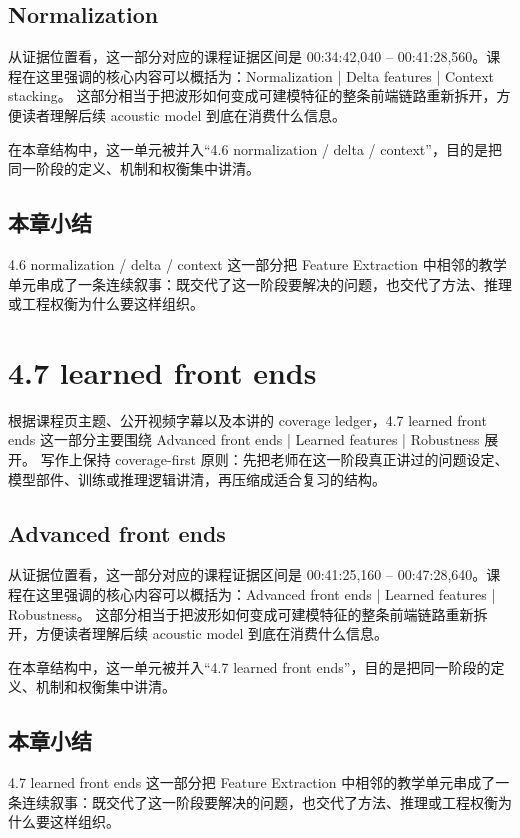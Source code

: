 \documentclass[a4paper]{article}
\begin{document}
\subsection{Normalization}
从证据位置看，这一部分对应的课程证据区间是 00:34:42,040 -- 00:41:28,560。课程在这里强调的核心内容可以概括为：Normalization | Delta features | Context stacking。
这部分相当于把波形如何变成可建模特征的整条前端链路重新拆开，方便读者理解后续 acoustic model 到底在消费什么信息。

在本章结构中，这一单元被并入“4.6 normalization / delta / context”，目的是把同一阶段的定义、机制和权衡集中讲清。

\subsection{本章小结}
4.6 normalization / delta / context 这一部分把 Feature Extraction 中相邻的教学单元串成了一条连续叙事：既交代了这一阶段要解决的问题，也交代了方法、推理或工程权衡为什么要这样组织。

\section{4.7 learned front ends}
根据课程页主题、公开视频字幕以及本讲的 coverage ledger，4.7 learned front ends 这一部分主要围绕 Advanced front ends | Learned features | Robustness 展开。
写作上保持 coverage-first 原则：先把老师在这一阶段真正讲过的问题设定、模型部件、训练或推理逻辑讲清，再压缩成适合复习的结构。

\subsection{Advanced front ends}
从证据位置看，这一部分对应的课程证据区间是 00:41:25,160 -- 00:47:28,640。课程在这里强调的核心内容可以概括为：Advanced front ends | Learned features | Robustness。
这部分相当于把波形如何变成可建模特征的整条前端链路重新拆开，方便读者理解后续 acoustic model 到底在消费什么信息。

在本章结构中，这一单元被并入“4.7 learned front ends”，目的是把同一阶段的定义、机制和权衡集中讲清。

\subsection{本章小结}
4.7 learned front ends 这一部分把 Feature Extraction 中相邻的教学单元串成了一条连续叙事：既交代了这一阶段要解决的问题，也交代了方法、推理或工程权衡为什么要这样组织。
\end{document}
